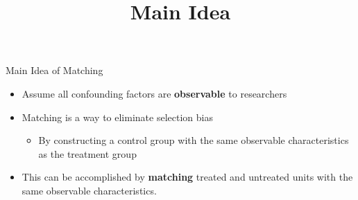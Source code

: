\documentclass[dvipsnames,hyperref={pdfpagelabels=false}]{beamer}
\begin{document}
\title[]  
{Main Idea}


\author 
{}

\institute{}






\date
{}


\begin{frame}{}
\titlepage
\end{frame}




\begin{frame}{Main Idea of Matching}
	\begin{itemize} 
		
		\item Assume all confounding factors are \textbf{observable} to researchers
				\vspace{0.2cm}

		\item Matching is a way to eliminate selection bias 
		
							\begin{itemize} 
												\vspace{0.2cm}
		\item By constructing a control group with the same observable characteristics as the treatment group
			\end{itemize}
				\vspace{0.2cm}
			\item This can be accomplished by \textbf{matching} treated and untreated units with the same observable characteristics.
		
		
	\end{itemize}
\end{frame}
\end{document}

